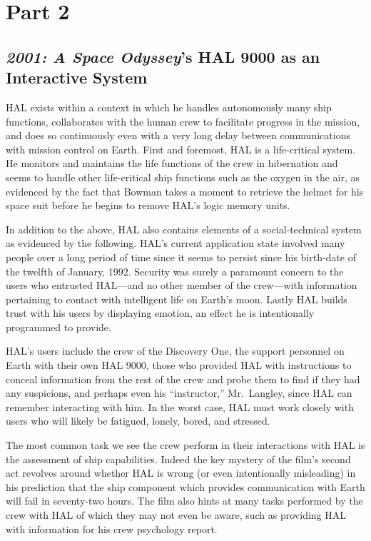 \documentclass{abrice}
\begin{document}
\section{Part 2}

\subsection{\emph{2001: A Space Odyssey}'s HAL 9000 as an Interactive System}

HAL exists within a context in which he handles autonomously many ship functions,
collaborates with the human crew to facilitate progress in the mission, and does
so continuously even with a very long delay between communications with mission
control on Earth. First and foremost, HAL is a life-critical system. He
monitors and maintains the life functions of the crew in hibernation and seems
to handle other life-critical ship functions such as the oxygen in the air, as
evidenced by the fact that Bowman takes a moment to retrieve the helmet for his
space suit before he begins to remove HAL's logic memory units.

In addition to the above, HAL also contains elements of a social-technical
system as evidenced by the following. HAL's current application state involved
many people over a long period of time since it seems to persist since his
birth-date of the twelfth of January, 1992. Security was surely a paramount
concern to the users who entrusted HAL---and no other member of the crew---with
information pertaining to contact with intelligent life on Earth's moon. Lastly
HAL builds trust with his users by displaying emotion, an effect he is
intentionally programmed to provide.

HAL's users include the crew of the Discovery One, the support personnel on
Earth with their own HAL 9000, those who provided HAL with instructions to
conceal information from the rest of the crew and probe them to find if they had
any suspicions, and perhaps even his ``instructor,'' Mr.~Langley, since HAL can
remember interacting with him. In the worst case, HAL must work closely with
users who will likely be fatigued, lonely, bored, and stressed.

The most common task we see the crew perform in their interactions with HAL is
the assessment of ship capabilities. Indeed the key mystery of the film's second
act revolves around whether HAL is wrong (or even intentionally misleading) in
his prediction that the ship component which provides communication with Earth
will fail in seventy-two hours. The film also hints at many tasks performed by
the crew with HAL of which they may not even be aware, such as providing HAL
with information for his crew psychology report.
\end{document}

